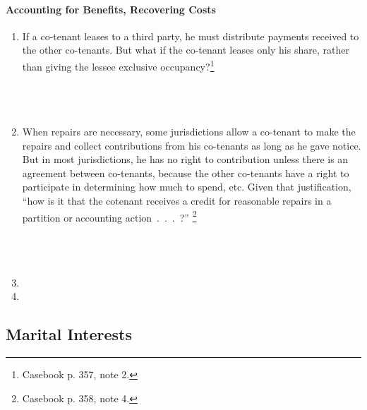 \paragraph{Accounting for Benefits, Recovering Costs}

\begin{enumerate}
    \item If a co-tenant leases to a third party, he must distribute payments 
    received to the other co-tenants. But what if the co-tenant leases only 
    his share, rather than giving the lessee exclusive 
    occupancy?\footnote{Casebook p. 357, note 2.}
    ~\\\\\\\\ %
    \item When repairs are necessary, some jurisdictions allow a co-tenant to 
    make the repairs and collect contributions from his co-tenants as long as 
    he gave notice. But in most jurisdictions, he has no right to contribution 
    unless there is an agreement between co-tenants, because the other 
    co-tenants have a right to participate in determining how much to spend, 
    etc. Given that justification, ``how is it that the cotenant receives a 
    credit for reasonable repairs in a partition or accounting 
    action~.~.~.~?'' \footnote{Casebook p. 358, note 4.}
    ~\\\\\\\\ %
    \item  %
    \item %

\end{enumerate}

\subsection{Marital Interests}

